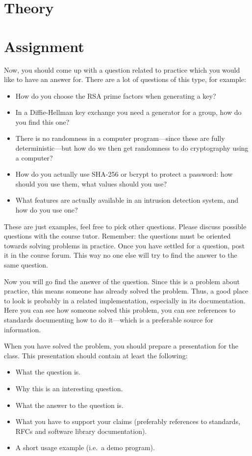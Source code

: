 \section{Theory}
\label{sec:theory}



\section{Assignment}
\label{sec:tasks}
Now, you should come up with a question related to practice which you would 
like to have an answer for.
There are a lot of questions of this type, for example:
\begin{itemize}
  \item How do you choose the RSA prime factors when generating a key?

  \item In a Diffie-Hellman key exchange you need a generator for a group, how 
    do you find this one?

  \item There is no randomness in a computer program---since these are fully 
    deterministic---but how do we then get randomness to do cryptography using 
    a computer?

  \item How do you actually use SHA-256 \cite{shs} or bcrypt \cite{bcrypt} to 
    protect a password: how should you use them, what values should you use?

  \item What features are actually available in an intrusion detection system, 
    and how do you use one?

\end{itemize}
These are just examples, feel free to pick other questions.
Please discuss possible questions with the course tutor.
Remember: the questions must be oriented towards solving problems in practice.
Once you have settled for a question, post it in the course forum.
This way no one else will try to find the answer to the same question.

Now you will go find the answer of the question.
Since this is a problem about practice, this means someone has already solved 
the problem.
Thus, a good place to look is probably in a related implementation, especially 
in its documentation.
Here you can see how someone solved this problem, you can see references to 
standards documenting how to do it---which is a preferable source for 
information.

When you have solved the problem, you should prepare a presentation for the 
class.
This presentation should contain at least the following:
\begin{itemize}
  \item What the question is.
  \item Why this is an interesting question.
  \item What the answer to the question is.
  \item What you have to support your claims (preferably references to 
    standards, RFCs and software library documentation).
  \item A short usage example (i.e.~a demo program).
\end{itemize}


